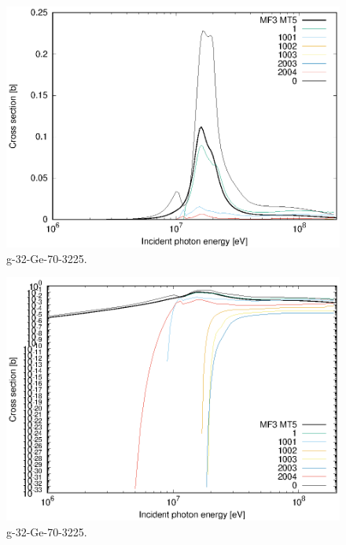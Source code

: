 \begin{figure}
 \includegraphics[width=\linewidth]{eps/g_32-Ge-70_3225.eps}
  \caption{g-32-Ge-70-3225.}
\end{figure}
\begin{figure}
 \includegraphics[width=\linewidth]{eps-log/g_32-Ge-70_3225.eps}
 \caption{g-32-Ge-70-3225.}
\end{figure}
\newpage \clearpage


